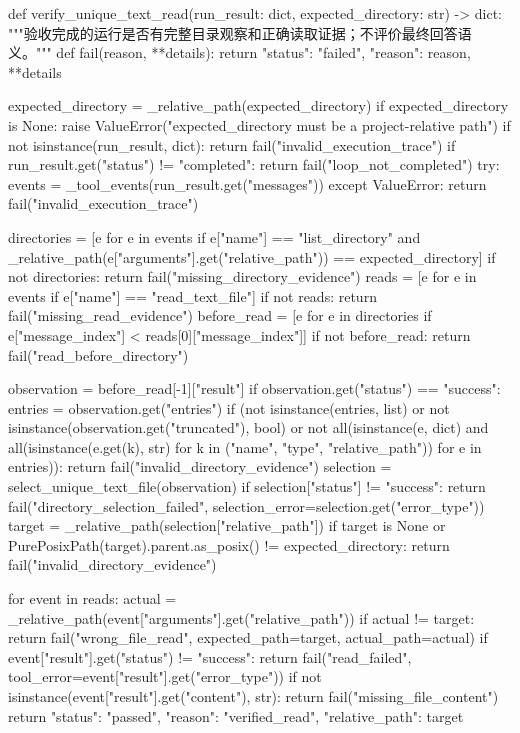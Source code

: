 \documentclass[UTF8,zihao=-4,fontset=fandol]{ctexart}
\begin{document}
\begin{Code}
def verify_unique_text_read(run_result: dict, expected_directory: str) -> dict:
    """验收完成的运行是否有完整目录观察和正确读取证据；不评价最终回答语义。"""
    def fail(reason, **details):
        return {"status": "failed", "reason": reason, **details}

    expected_directory = _relative_path(expected_directory)
    if expected_directory is None:
        raise ValueError("expected_directory must be a project-relative path")
    if not isinstance(run_result, dict):
        return fail("invalid_execution_trace")
    if run_result.get("status") != "completed":
        return fail("loop_not_completed")
    try:
        events = _tool_events(run_result.get("messages"))
    except ValueError:
        return fail("invalid_execution_trace")

    directories = [e for e in events if e["name"] == "list_directory"
                   and _relative_path(e["arguments"].get("relative_path")) == expected_directory]
    if not directories:
        return fail("missing_directory_evidence")
    reads = [e for e in events if e["name"] == "read_text_file"]
    if not reads:
        return fail("missing_read_evidence")
    before_read = [e for e in directories if e["message_index"] < reads[0]["message_index"]]
    if not before_read:
        return fail("read_before_directory")

    observation = before_read[-1]["result"]
    if observation.get("status") == "success":
        entries = observation.get("entries")
        if (not isinstance(entries, list) or not isinstance(observation.get("truncated"), bool)
                or not all(isinstance(e, dict) and all(isinstance(e.get(k), str)
                           for k in ("name", "type", "relative_path")) for e in entries)):
            return fail("invalid_directory_evidence")
    selection = select_unique_text_file(observation)
    if selection["status"] != "success":
        return fail("directory_selection_failed", selection_error=selection.get("error_type"))
    target = _relative_path(selection["relative_path"])
    if target is None or PurePosixPath(target).parent.as_posix() != expected_directory:
        return fail("invalid_directory_evidence")

    for event in reads:
        actual = _relative_path(event["arguments"].get("relative_path"))
        if actual != target:
            return fail("wrong_file_read", expected_path=target, actual_path=actual)
        if event["result"].get("status") != "success":
            return fail("read_failed", tool_error=event["result"].get("error_type"))
        if not isinstance(event["result"].get("content"), str):
            return fail("missing_file_content")
    return {"status": "passed", "reason": "verified_read", "relative_path": target}
\end{Code}
\end{document}
